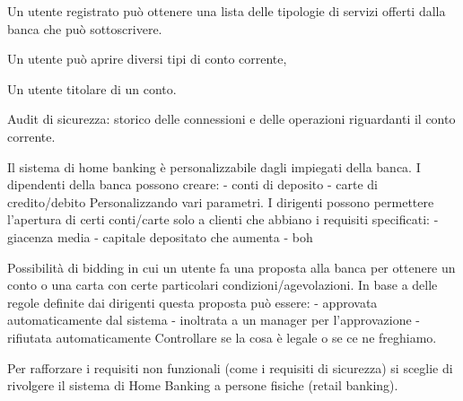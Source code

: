 Un utente registrato pu\`o ottenere una lista delle tipologie di servizi offerti dalla banca che pu\`o sottoscrivere.

Un utente pu\`o aprire diversi tipi di conto corrente, 

Un utente titolare di un conto.

Audit di sicurezza:
storico delle connessioni e delle operazioni riguardanti il conto corrente.

Il sistema di home banking \`e personalizzabile dagli impiegati della banca.
I dipendenti della banca possono creare:
- conti di deposito
- carte di credito/debito
Personalizzando vari parametri.
I dirigenti possono permettere l'apertura di certi conti/carte solo a clienti che abbiano i requisiti specificati:
- giacenza media
- capitale depositato che aumenta
- boh

Possibilit\`a di bidding in cui un utente fa una proposta alla banca per ottenere un conto o una carta con certe particolari condizioni/agevolazioni.
In base a delle regole definite dai dirigenti questa proposta pu\`o essere:
- approvata automaticamente dal sistema
- inoltrata a un manager per l'approvazione
- rifiutata automaticamente
Controllare se la cosa \`e legale o se ce ne freghiamo.




Per rafforzare i requisiti non funzionali (come i requisiti di sicurezza) si sceglie di rivolgere il sistema di Home Banking a persone fisiche (retail banking).

